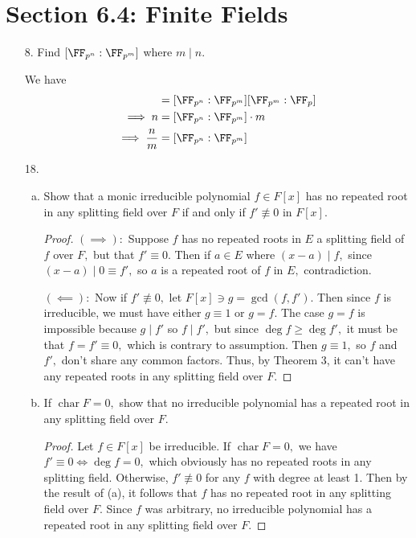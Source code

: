 \documentclass{article}
\DeclareMathOperator{\cha}{char}
\begin{document}
\section*{Section 6.4: Finite Fields}

\begin{itemize}
	\item[8.] Find $[\FF_{p^n}:\FF_{p^m}]$ where $m\mid n.$
		\begin{soln}
			We have
			\begin{align*}
				[\FF_{p^n}:\FF_p] &= [\FF_{p^n}:\FF_{p^m}][\FF_{p^m}:\FF_p] \\
				\implies n &= [\FF_{p^n}:\FF_{p^m}] \cdot m \\
				\implies \frac{n}{m} &= [\FF_{p^n}:\FF_{p^m}]
			\end{align*}
		\end{soln}

	\item[18.]
		\begin{enumerate}[(a)]
			\item Show that a monic irreducible polynomial $f\in F[x]$ has no repeated root in any splitting field over $F$ if and only if $f'\not\equiv 0$ in $F[x].$  
				\begin{proof}
					$(\implies):$ Suppose $f$ has no repeated roots in $E$ a splitting field of $f$ over $F,$ but that $f'\equiv0.$ Then if $a\in E$ where $(x-a)\mid f,$ since $(x-a)\mid 0\equiv f',$ so $a$ is a repeated root of $f$ in $E,$ contradiction.

					$(\impliedby):$ Now if $f'\not\equiv 0,$ let $F[x]\ni g=\gcd(f, f').$ Then since $f$ is irreducible, we must have either $g\equiv1$ or $g=f.$ The case $g=f$ is impossible because $g\mid f'$ so $f\mid f',$ but since $\deg f\ge \deg f',$ it must be that $f=f'\equiv0,$ which is contrary to assumption. Then $g\equiv1,$ so $f$ and $f',$ don't share any common factors. Thus, by Theorem 3, it can't have any repeated roots in any splitting field over $F.$
				\end{proof}

			\item If $\cha F=0,$ show that no irreducible polynomial has a repeated root in any splitting field over $F.$
				\begin{proof}
					Let $f\in F[x]$ be irreducible. If $\cha F=0,$ we have $f'\equiv0\iff \deg f = 0,$ which obviously has no repeated roots in any splitting field. Otherwise, $f'\not\equiv0$ for any $f$ with degree at least 1. Then by the result of (a), it follows that $f$ has no repeated root in any splitting field over $F.$ Since $f$ was arbitrary, no irreducible polynomial has a repeated root in any splitting field over $F.$
				\end{proof}
				

\end{enumerate}
\end{itemize}
\end{document}
